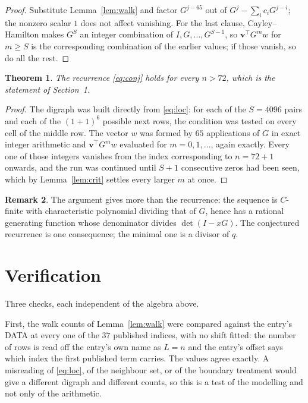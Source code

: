 \documentclass[11pt,a4paper]{article}
\theoremstyle{plain}
\newtheorem{theorem}{Theorem}
\theoremstyle{definition}
\newtheorem{remark}[theorem]{Remark}
\begin{document}
\begin{proof}
Substitute Lemma~\ref{lem:walk} and factor $G^{j-65}$ out of
$G^{j}-\sum_ic_iG^{j-i}$; the nonzero scalar $1$ does not affect
vanishing. For the last clause, Cayley--Hamilton makes $G^{S}$ an integer combination of
$I,G,\dots,G^{S-1}$, so $\mathbf{v}^{\!\top}G^{m}w$ for $m\ge S$ is the corresponding
combination of the earlier values; if those vanish, so do all the rest.
\end{proof}

\begin{theorem}
The recurrence \eqref{eq:conj} holds for every $n>72$, which is the statement of
Section~1.
\end{theorem}

\begin{proof}
The digraph was built directly from \eqref{eq:loc}: for each of the $S=4096$ pairs and each
of the $(1+1)^{6}$ possible next rows, the condition was tested on every cell of
the middle row. The vector $w$ was formed by $65$ applications of $G$ in exact integer
arithmetic and $\mathbf{v}^{\!\top}G^{m}w$ evaluated for $m=0,1,\dots$, again exactly.
Every one of those integers vanishes from the index corresponding to $n=72+1$ onwards,
and the run was continued until $S+1$ consecutive zeros had been seen, which by
Lemma~\ref{lem:crit} settles every larger $m$ at once.
\end{proof}

\begin{remark}
The argument gives more than the recurrence: the sequence is $C$-finite with characteristic
polynomial dividing that of $G$, hence has a rational generating function whose denominator
divides $\det(I-xG)$. The conjectured recurrence is one consequence; the minimal one is a
divisor of $q$.
\end{remark}

\section{Verification}

Three checks, each independent of the algebra above.

First, the walk counts of Lemma~\ref{lem:walk} were compared against the entry's DATA at
every one of the $37$ published indices, with no shift fitted: the number of rows is
read off the entry's own name as $L=n$ and the entry's offset says which index the first
published term carries. The values agree exactly. A misreading of \eqref{eq:loc}, of the
neighbour set, or of the boundary treatment would give a different digraph and different
counts, so this is a test of the modelling and not only of the arithmetic.
\end{document}
